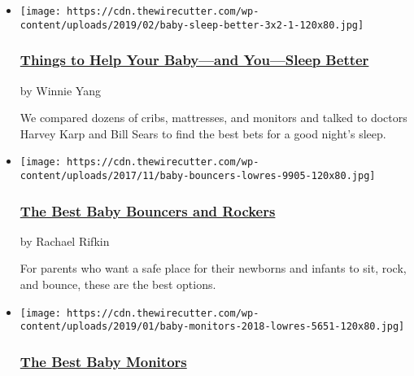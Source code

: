 \begin{itemize}
\item
  \href{https://www.nytimes3xbfgragh.onion/wirecutter/lists/things-to-help-your-baby-and-you-sleep-better/}{}

  \texttt{[image: https://cdn.thewirecutter.com/wp-content/uploads/2019/02/baby-sleep-better-3x2-1-120x80.jpg]}

  \hypertarget{things-to-help-your-babyand-yousleep-better}{%
  \subsubsection{\texorpdfstring{\href{https://www.nytimes3xbfgragh.onion/wirecutter/lists/things-to-help-your-baby-and-you-sleep-better/}{Things
  to Help Your Baby---and You---Sleep
  Better}}{Things to Help Your Baby---and You---Sleep Better}}\label{things-to-help-your-babyand-yousleep-better}}

  by Winnie Yang

  We compared dozens of cribs, mattresses, and monitors and talked to
  doctors Harvey Karp and Bill Sears to find the best bets for a good
  night's sleep.
\item
  \href{https://www.nytimes3xbfgragh.onion/wirecutter/reviews/best-baby-bouncers-and-rockers/}{}

  \texttt{[image: https://cdn.thewirecutter.com/wp-content/uploads/2017/11/baby-bouncers-lowres-9905-120x80.jpg]}

  \hypertarget{the-best-baby-bouncers-and-rockers}{%
  \subsubsection{\texorpdfstring{\href{https://www.nytimes3xbfgragh.onion/wirecutter/reviews/best-baby-bouncers-and-rockers/}{The
  Best Baby Bouncers and
  Rockers}}{The Best Baby Bouncers and Rockers}}\label{the-best-baby-bouncers-and-rockers}}

  by Rachael Rifkin

  For parents who want a safe place for their newborns and infants to
  sit, rock, and bounce, these are the best options.
\item
  \href{https://www.nytimes3xbfgragh.onion/wirecutter/reviews/best-baby-monitor/}{}

  \texttt{[image: https://cdn.thewirecutter.com/wp-content/uploads/2019/01/baby-monitors-2018-lowres-5651-120x80.jpg]}

  \hypertarget{the-best-baby-monitors}{%
  \subsubsection{\texorpdfstring{\href{https://www.nytimes3xbfgragh.onion/wirecutter/reviews/best-baby-monitor/}{The
  Best Baby
  Monitors}}{The Best Baby Monitors}}\label{the-best-baby-monitors}}


\end{itemize}
